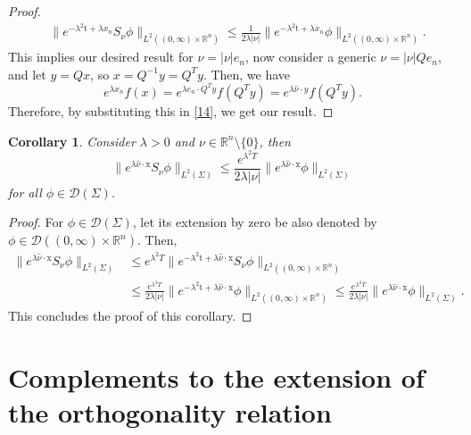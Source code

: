 \documentclass[10pt,a4paper]{amsart}
\newtheorem{corollary}[proposition]{Corollary}
\theoremstyle{remark}
\theoremstyle{definition}
\newcommand{\R}{\mathbb{R}}
\newcommand{\tm}{\mathrm{t}}
\newcommand{\x}{\mathrm{x}}
\begin{document}
\begin{proof}
\begin{align}\label{14}
    & \|e^{-\lambda^2 \tm + \lambda x_n} S_\nu \phi\|_{L^2((0, \infty)\times\R^{n})}  \leq \frac{1}{2 \lambda |\nu|} \| e^{-\lambda^2 \tm + \lambda x_n} \phi \|_{L^2((0, \infty) \times \R^n)}.
\end{align}
This implies our desired result for $\nu = |{\nu}| e_{n}$, now consider a generic ${\nu}=|{\nu}| Qe_{n}$, and let ${y} = Q{x}$, so ${x} = Q^{-1}{y} = Q^{T}{y}$. Then, we have
$$e^{\lambda x_n}f(x) =e^{\lambda e_{n}\cdot Q^{T}y}f(Q^{T}y) = e^{\lambda \hat{\nu} \cdot y}f({Q^{T}{y}}).$$
Therefore, by substituting this in \eqref{14}, we get our result.
\end{proof}
\fi

\begin{corollary}\sl Consider $\lambda > 0$ and $\nu \in \R^n \setminus\{ 0 \}$,
then
\[ \| e^{\lambda \hat{\nu} \cdot \x} S_\nu \phi \|_{L^2(\Sigma)} \leq \frac{e^{\lambda^2 T}}{2 \lambda |\nu|} \| e^{\lambda \hat{\nu} \cdot \x} \phi \|_{L^2(\Sigma)} \]
for all $\phi \in \mathcal{D}(\Sigma)$.
\end{corollary}

\begin{proof}
For $\phi \in \mathcal{D}(\Sigma)$, let its extension by zero be also denoted by $\phi \in\mathcal{D}((0, \infty) \times \R^n) $. Then,
\begin{align*}
\| e^{\lambda \hat{\nu} \cdot \x} S_\nu \phi \|_{L^2(\Sigma)} & \leq e^{\lambda^2 T} \| e^{-\lambda^2 \tm + \lambda \hat{\nu} \cdot \x} S_\nu \phi \|_{L^2((0, \infty) \times \R^n)}\\
& \leq \frac{e^{\lambda^2 T}}{2 \lambda |\nu|} \| e^{-\lambda^2 \tm + \lambda \hat{\nu} \cdot \x} \phi \|_{L^2((0, \infty) \times \R^n)} \leq \frac{e^{\lambda^2 T}}{2 \lambda |\nu|} \| e^{\lambda \hat{\nu} \cdot \x} \phi \|_{L^2(\Sigma)}.
\end{align*}
This concludes the proof of this corollary.
\end{proof}


\section{Complements to the extension of the orthogonality relation}\label{sec:extension_ortho}
\end{document}
